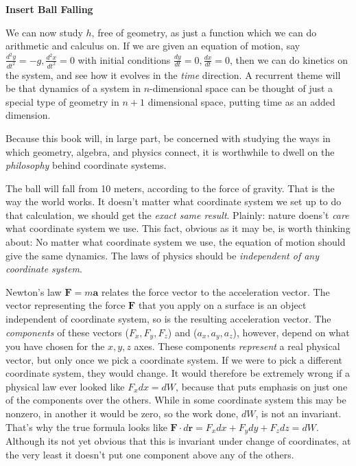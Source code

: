 \documentclass[../master.tex]{subfiles}
\begin{document}
	\textbf{Insert Ball Falling}
	
	We can now study $h$, free of geometry, as just a function which we can do arithmetic and calculus on. If we are given an equation of motion, say $\frac{d^2y}{dt^2} = -g, \frac{d^2x}{dt^2} = 0$ with initial conditions $\frac{dy}{dt}=0, \frac{dx}{dt}=0$, then we can do kinetics on the system, and see how it evolves in the \emph{time} direction. A recurrent theme will be that dynamics of a system in $n$-dimensional space can be thought of just a special type of geometry in $n+1$ dimensional space, putting time as an added dimension. 
	
	Because this book will, in large part, be concerned with studying the ways in which geometry, algebra, and physics connect, it is worthwhile to dwell on the \emph{philosophy} behind coordinate systems.
	
	The ball will fall from 10 meters, according to the force of gravity. That is the way the world works. It doesn't matter what coordinate system we set up to do that calculation, we should get the \emph{exact same result}. Plainly: nature doens't \emph{care} what coordinate system we use. This fact, obvious as it may be, is worth thinking about: No matter what coordinate system we use, the equation of motion should give the same dynamics. The laws of physics should be \emph{independent of any coordinate system}.
	
	Newton's law $\mathbf F = m \mathbf a$ relates the force vector to the acceleration vector. The vector representing the force $\mathbf F$ that you apply on a surface is an object independent of coordinate system, so is the resulting acceleration vector. The \emph{components} of these vectors ($F_x, F_y, F_z$) and ($a_x, a_y, a_z$), however, depend on what you have chosen for the $x,y,z$ axes. These components \emph{represent} a real physical vector, but only once we pick a coordinate system. If we were to pick a different coordinate system, they would change. It would therefore be extremely wrong if a physical law ever looked like $F_x dx = dW$, because that puts emphasis on just one of the components over the others. While in some coordinate system this may be nonzero, in another it would be zero, so the work done, $dW$, is not an invariant. That's why the true formula looks like $\mathbf F \cdot  d \mathbf r = F_x dx + F_y dy + F_z dz = d W$. Although its not yet obvious that this is invariant under change of coordinates, at the very least it doesn't put one component above any of the others.
	
\end{document}
